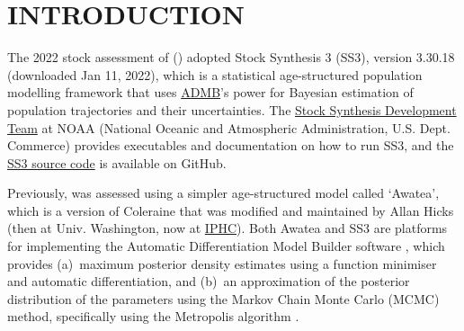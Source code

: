 \documentclass[11pt]{book}
\begin{document}
\newcommand{\LH}{}%
\newcommand{\RH}{}%
\newcommand{\LF}{\spn{} 2022}
\newcommand{\RF}{APPENDIX~\thechapter ~-- Model Equations}

\lhead{\LH}\rhead{\RH}\lfoot{\LF}\rfoot{\RF}

\newcommand{\nSims}{8,000\,(for base)\,/ 4,000\,(for sensitivities)}
\newcommand{\nChains}{8}
\newcommand{\cSims}{1,000\,(base)\,/ 500\,(sens)}
\newcommand{\cBurn}{750\,(base)\,/ 250\,(sens)}
\newcommand{\cSamps}{250}
\newcommand{\Nmcmc}{2,000}
\newcommand{\Nbase}{2,000}

\newcommand{\harvestMax}{0.401}
\newcommand{\harvestInc}{0.001}
\newcommand{\policyMax}{2000}
\newcommand{\policyInc}{250}
\newcommand{\currYear}{2023} %
\newcommand{\prevYear}{2022} %
\newcommand{\projYear}{2033} %

\section{INTRODUCTION}%

The 2022 stock assessment of \spn{} (\spc) adopted Stock Synthesis 3 (SS3), version 3.30.18 (downloaded Jan 11, 2022), which is a statistical age-structured population modelling framework \citep{Methot-Wetzel:2013} that uses \href{https://www.admb-project.org/}{ADMB}'s power for Bayesian estimation of population trajectories and their uncertainties.
The \href{https://vlab.ncep.noaa.gov/web/stock-synthesis/home}{Stock Synthesis Development Team} at NOAA (National Oceanic and Atmospheric Administration, U.S. Dept. Commerce) provides executables and documentation on how to run SS3, and the \href{https://github.com/nmfs-stock-synthesis/stock-synthesis}{SS3 source code} is available on GitHub.

Previously, \spc{} was assessed using a simpler age-structured model called `Awatea', which is a version of Coleraine \citep{Hilborn-etal:2003} that was modified and maintained by Allan Hicks (then at Univ. Washington, now at \href{https://www.iphc.int/}{IPHC}).
Both Awatea and SS3 are platforms for implementing the Automatic Differentiation Model Builder software \citep{ADMB:2009}, which provides (a)~maximum posterior density estimates using a function minimiser and automatic differentiation, and (b)~an approximation of the posterior distribution of the parameters using the Markov Chain Monte Carlo (MCMC) method, specifically using the Metropolis algorithm \citep{Gelman-etal:2004}.
\end{document}
